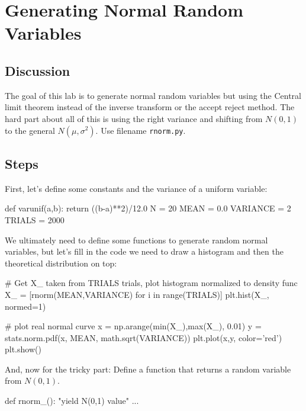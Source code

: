 \chapter{Generating Normal Random Variables}

\setcounter{problem}{1}
\section{Discussion}

\begin{fullwidth}


The goal of this lab is to generate normal random variables but using the Central limit  theorem instead of the inverse transform or the accept reject method. The hard part about all of this is using the right variance and shifting from $N(0,1)$ to the general $N(\mu, \sigma^2)$. Use filename {\tt rnorm.py}.

\section{Steps}

\step First, let's define some constants and the variance of a uniform variable:

\begin{pyverbatim}
def varunif(a,b):
	return ((b-a)**2)/12.0
N = 20
MEAN = 0.0
VARIANCE = 2
TRIALS = 2000
\end{pyverbatim}

\step  We ultimately need to define some functions to generate random normal variables, but let's fill in the code we need to draw a histogram and then the theoretical distribution on top:

\begin{pyverbatim}
# Get X_ taken from TRIALS trials, plot histogram normalized to density func
X_ = [rnorm(MEAN,VARIANCE) for i in range(TRIALS)]
plt.hist(X_, normed=1)

# plot real normal curve
x = np.arange(min(X_),max(X_), 0.01)
y = stats.norm.pdf(x, MEAN, math.sqrt(VARIANCE))
plt.plot(x,y, color='red')
plt.show()
\end{pyverbatim}

\step And, now for the tricky part:  Define a function that returns a random variable from $N(0,1)$.

\begin{pyverbatim}
def rnorm_():
    "yield N(0,1) value"
    ...
\end{pyverbatim}	


\end{fullwidth}
